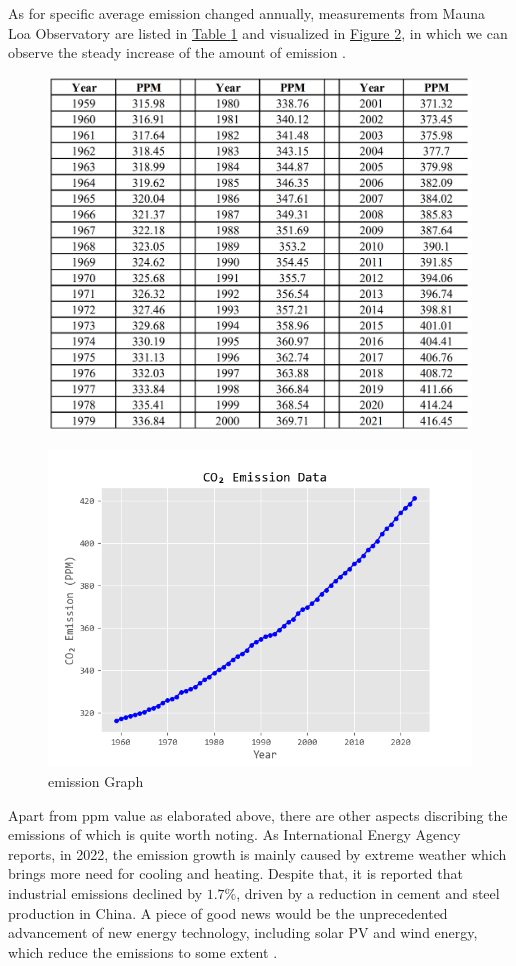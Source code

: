 \documentclass[12pt,a4paper]{article}
\begin{document}
    As for specific average  emission changed annually, measurements from Mauna Loa Observatory are listed in \hyperref[emission]{Table \ref*{emission}} and visualized in \hyperref[emission_line]{Figure \ref*{emission_line}}, in which we can observe the steady increase of the amount of  emission \autocite{national_oceanographic_and_atmospheric_administration_gml_data_notitle_2023}.
    \begin{figure}[htbp]
        \centering
        \includegraphics[width=\linewidth]{img/emission.png}
        \label{emission}
    \end{figure}
    \begin{figure}[htbp]
        \centering
        \includegraphics[width=0.5\linewidth]{img/emission_line.png}
        \caption{ emission Graph}
        \label{emission_line}
    \end{figure}
    
    Apart from ppm value as elaborated above, there are other aspects discribing the emissions of  which is quite worth noting. As International Energy Agency reports, in 2022, the emission growth is mainly caused by extreme weather which brings more need for cooling and heating. Despite that, it is reported that industrial emissions declined by $1.7\%$, driven by a reduction in cement and steel production in China. A piece of good news would be the unprecedented advancement of new energy technology, including solar PV and wind energy, which reduce the  emissions to some extent \autocite{iea_co2_2023}.
    
\end{document}
